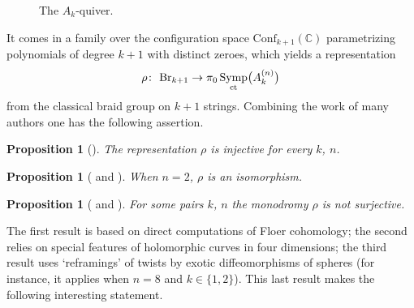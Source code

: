 \documentclass[10pt,a4paper]{amsart}
\DeclareMathOperator{\Symp}{Symp}
\def\bC{\mathbb{C}}
\newtheorem{prop}[thm]{Proposition}
\theoremstyle{definition}
\numberwithin{equation}{section}
\begin{document}
\begin{figure}[h]
	\centering
	\caption{The $A_k$-quiver.}
\end{figure}

It comes in a family over the configuration space $\mathrm{Conf}_{k+1}(\bC)$ parametrizing polynomials of degree $k+1$ with distinct zeroes, which yields a representation
\[
\rho\colon \ {\rm Br}_{k+1} \to \pi_0\Symp_{\rm ct}\bigl(A_k^{(n)}\bigr)
\]
from the classical braid group on $k+1$ strings. Combining the work of many authors one has the following assertion.

\begin{prop}[{\cite[Corollary 1.4]{Khovanov-Seidel}}]
The representation $\rho$ is injective for every $k$, $n$.
\end{prop}

\begin{prop}[{\cite[Theorem~1.4]{Evans} and \cite[Theorem~1.2]{Wu}}]
When $n=2$, $\rho$ is an isomorphism.
\end{prop}

\begin{prop}[{\cite[Corollary 17.17]{Seidel:FCPLT} and \cite[Theorem A]{DRE}}]
 For some pairs $k$, $n$ the monodromy $\rho$ is not surjective.
\end{prop}

The first result is based on direct computations of Floer cohomology; the second relies on special features of holomorphic curves in four dimensions; the third result uses `reframings' of twists by exotic diffeomorphisms of spheres (for instance, it applies when $n=8$ and $k\in\{1,2\}$). This last result makes the following interesting statement.
\end{document}
